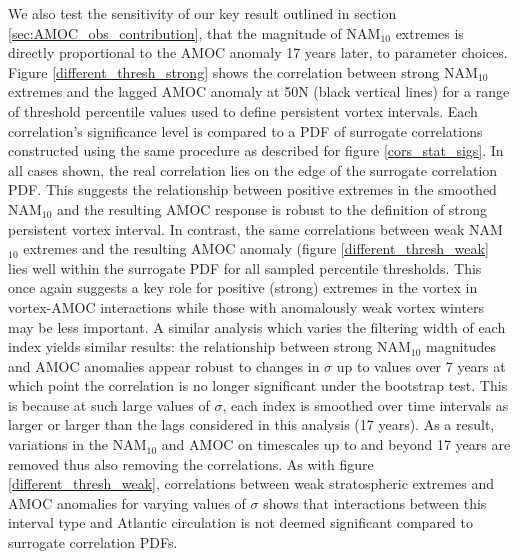 We also test the sensitivity of our key result outlined in section \ref{sec:AMOC_obs_contribution}, that the magnitude of NAM$_{10}$ extremes is directly proportional to the AMOC anomaly 17 years later, to parameter choices. Figure \ref{different_thresh_strong} shows the correlation between strong NAM$_{10}$ extremes and the lagged AMOC anomaly at 50N (black vertical lines) for a range of threshold percentile values used to define persistent vortex intervals. Each correlation's significance level is compared to a PDF of surrogate correlations constructed using the same procedure as described for figure \ref{cors_stat_sigs}. In all cases shown, the real correlation lies on the edge of the surrogate correlation PDF. This suggests the relationship between positive extremes in the smoothed NAM$_{10}$ and the resulting AMOC response is robust to the definition of strong persistent vortex interval. In contrast, the same correlations between weak NAM$_{10}$ extremes and the resulting AMOC anomaly (figure \ref{different_thresh_weak} lies well within the surrogate PDF for all sampled percentile thresholds. This once again suggests a key role for positive (strong) extremes in the vortex in vortex-AMOC interactions while those with anomalously weak vortex winters may be less important. A similar analysis which varies the filtering width of each index yields similar results: the relationship between strong NAM$_{10}$ magnitudes and AMOC anomalies appear robust to changes in $\sigma$ up to values over 7 years at which point the correlation is no longer significant under the bootstrap test. This is because at such large values of $\sigma$, each index is smoothed over time intervals as larger or larger than the lags considered in this analysis (17 years). As a result, variations in the NAM$_{10}$ and AMOC on timescales up to and beyond 17 years are removed thus also removing the correlations. As with figure \ref{different_thresh_weak}, correlations between weak stratospheric extremes and AMOC anomalies for varying values of  $\sigma$ shows that interactions between this interval type and Atlantic circulation is not deemed significant compared to surrogate correlation PDFs.

\newpage

